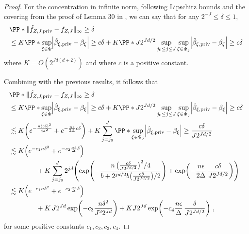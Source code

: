 \documentclass{article}
\newcommand{\1}{\mathds{1}}
\DeclarePairedDelimiter{\abs}{\lvert}{\rvert}
\DeclarePairedDelimiter{\paren}{\lparen}{\rparen}
\theoremstyle{plain}
\theoremstyle{definition}
\theoremstyle{remark}
\begin{document}
\begin{proof}
For the concentration in infinite norm, following Lipschitz bounds and the covering from the proof of Lemma 30 in \cite{Manole2024Plugin}, we can say that for any $2^{-J} \leq \delta \leq 1$,
\begin{equation}
    \begin{aligned}
        &\PP*{\| \hat{f}_{Z, J, \textrm{priv}} - f_{Z, J} \|_{\infty} \geq \delta} \\
        &\leq
        K \PP*{\sup_{\xi \in \Phi} \abs*{\hat{\beta}_{\xi, \textrm{priv}} - {\beta}_{\xi}} \geq c \delta}
        + K \PP*{J 2^{Jd/2} \sup_{j_0\leq j \leq J}\sup_{\xi \in \Psi_j} \abs*{\hat{\beta}_{\xi, \textrm{priv}} - {\beta}_{\xi}} \geq  c\delta} 
    \end{aligned}
\end{equation}
where $K = O(2^{Jd(d+2)})$ and where $c$ is a positive constant.

Combining with the previous results, it follows that 
\begin{equation}
    \begin{aligned}
        &\PP*{\| \hat{f}_{Z, J, \textrm{priv}} - f_{Z, J} \|_{\infty} \geq \delta} \\
        &\leq 
        K \PP*{\sup_{\xi \in \Phi} \abs*{\hat{\beta}_{\xi, \textrm{priv}} - {\beta}_{\xi}} \geq c \delta}
        + K \PP*{J 2^{Jd/2} \sup_{j_0\leq j \leq J}\sup_{\xi \in \Psi_j} \abs*{\hat{\beta}_{\xi, \textrm{priv}} - {\beta}_{\xi}} \geq  c\delta} \\
        &\lesssim 
        K \paren*{e^{- \frac{n (c\delta)^2}{4a^2}} + e^{- \frac{n \epsilon}{2 \Delta} c\delta}}
        + K \sum_{j=j_0}^J 
        \PP*{\sup_{\xi \in \Psi_j} \abs*{\hat{\beta}_{\xi, \textrm{priv}} - {\beta}_{\xi}} \geq \frac{c\delta}{J2^{Jd/2}}} \\
        &\lesssim 
        K \paren*{e^{- c_1 n\delta^2} + e^{- c_2 \frac{n \epsilon}{\Delta}\delta}} \\
        &\qquad\qquad+ K \sum_{j=j_0}^J 2^{jd}
        \paren*{
        \exp \paren*{- \frac{n \, \paren*{ \frac{c\delta}{J2^{Jd/2}} }^2/4}{b+2^{jd/2} b \paren*{ \frac{c\delta}{J2^{Jd/2}} }/2}}
        + \exp \paren*{- \frac{n\epsilon}{2\Delta}\,\frac{c\delta}{J2^{Jd/2}}}
        } \\
        &\lesssim 
        K \paren*{e^{- c_1 n\delta^2} + e^{- c_2 \frac{n \epsilon}{\Delta}\delta}} \\
        &\qquad\qquad + K \,J 2^{Jd}
        \exp \paren*{- c_3 \frac{n\delta^2}{J^2 2^{Jd}}}
        + K J 2^{Jd}
        \exp \paren*{- c_4 \frac{n\epsilon}{\Delta}\,\frac{\delta}{J2^{Jd/2}}} \;,
    \end{aligned}
\end{equation}
for some positive constants $c_1,c_2,c_3,c_4$.


\end{proof}
\end{document}
